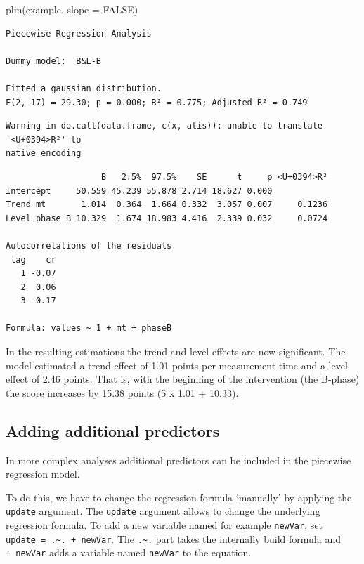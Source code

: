 \documentclass[
]{book}
\newenvironment{Shaded}{\begin{snugshade}}{\end{snugshade}}
\newcommand{\AttributeTok}[1]{\textcolor[rgb]{0.77,0.63,0.00}{#1}}
\newcommand{\ConstantTok}[1]{\textcolor[rgb]{0.00,0.00,0.00}{#1}}
\newcommand{\FunctionTok}[1]{\textcolor[rgb]{0.00,0.00,0.00}{#1}}
\newcommand{\NormalTok}[1]{#1}
\begin{document}
\begin{Shaded}
\begin{Highlighting}[]
\FunctionTok{plm}\NormalTok{(example, }\AttributeTok{slope =} \ConstantTok{FALSE}\NormalTok{)}
\end{Highlighting}
\end{Shaded}

\begin{verbatim}
Piecewise Regression Analysis

Dummy model:  B&L-B 

Fitted a gaussian distribution.
F(2, 17) = 29.30; p = 0.000; R² = 0.775; Adjusted R² = 0.749
\end{verbatim}

\begin{verbatim}
Warning in do.call(data.frame, c(x, alis)): unable to translate '<U+0394>R²' to
native encoding
\end{verbatim}

\begin{verbatim}
                   B   2.5%  97.5%    SE      t     p <U+0394>R²
Intercept     50.559 45.239 55.878 2.714 18.627 0.000           
Trend mt       1.014  0.364  1.664 0.332  3.057 0.007     0.1236
Level phase B 10.329  1.674 18.983 4.416  2.339 0.032     0.0724

Autocorrelations of the residuals
 lag    cr
   1 -0.07
   2  0.06
   3 -0.17

Formula: values ~ 1 + mt + phaseB
\end{verbatim}

In the resulting estimations the trend and level effects are now significant. The model estimated a trend effect of 1.01 points per measurement time and a level effect of 2.46 points. That is, with the beginning of the intervention (the B-phase) the score increases by 15.38 points (5 x 1.01 + 10.33).

\hypertarget{adding-additional-predictors}{%
\subsection{Adding additional predictors}\label{adding-additional-predictors}}

In more complex analyses additional predictors can be included in the piecewise regression model.

To do this, we have to change the regression formula `manually' by applying the \texttt{update} argument. The \texttt{update} argument allows to change the underlying regression formula. To add a new variable named for example \texttt{newVar}, set \texttt{update\ =\ .\textasciitilde{}.\ +\ newVar}. The \texttt{.\textasciitilde{}.} part takes the internally build formula and \texttt{+\ newVar} adds a variable named \texttt{newVar} to the equation.
\end{document}
